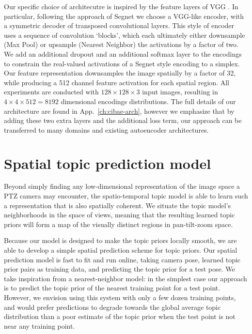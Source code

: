 Our specific choice of architecutre is inspired by the feature layers of VGG \citep{Simonyan14c}. In particular, following the approach of Segnet \citep{BadrinarayananK15} we choose a VGG-like encoder, with a symmetric decoder of transposed convolutional layers. This style of encoder uses a sequence of convolution `blocks', which each ultimately either downsample (Max Pool) or upsample (Nearest Neighbor) the activations by a factor of two. We add an additional dropout and an additional softmax layer to the encodings to constrain the real-valued activations of a Segnet style encoding to a simplex. Our feature representation downsamples the image spatially by a factor of 32, while producing a 512 channel feature activation for each spatial region. All experiments are conducted with $128 \times 128 \times 3$ input images, resulting in $4 \times 4 \times 512 = 8192$ dimensional encodings distributions. The full details of our architecture are found in App.~\ref{ch:cibae-arch}, however we emphasize that by adding these two extra layers and the additional loss term, our approach can be transferred to many domains and existing autoencoder architectures.

\section{Spatial topic prediction model}

Beyond simply finding any low-dimensional representation of the image space a PTZ camera may encounter, the spatio-temporal topic model is able to learn such a representation that is also spatially coherent. We situate the topic model's neighborhoods in the space of views, meaning that the resulting learned topic priors will form a map of the visually distinct regions in pan-tilt-zoom space.

Because our model is designed to make the topic priors locally smooth, we are able to develop a simple spatial prediction scheme for topic priors. Our spatial prediction model is fast to fit and run online, taking camera pose, learned topic prior pairs as training data, and predicting the topic prior for a test pose. We take inspiration from a nearest-neighbor model: in the simplest case our approach is to predict the topic prior of the nearest training point for a test point. However, we envision using this system with only a few dozen training points, and would prefer predictions to degrade towards the global average topic distribution than a poor estimate of the topic prior when the test point is not near any training point.


